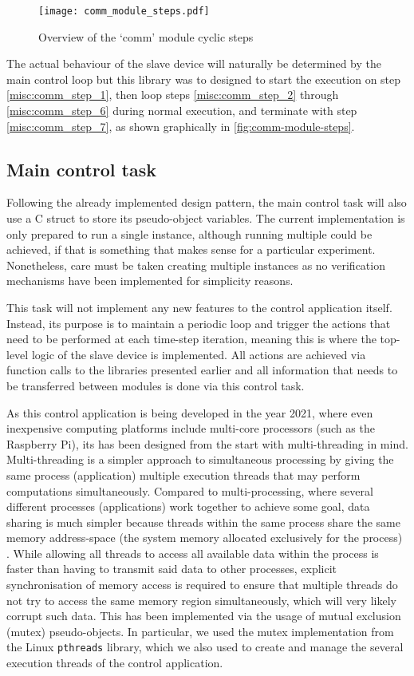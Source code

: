 \begin{figure}[htp]
	\centering
	\texttt{[image: comm\_module\_steps.pdf]}
	\caption{Overview of the `comm' module cyclic steps}
	\label{fig:comm-module-steps}
\end{figure}

The actual behaviour of the slave device will naturally be determined by the main control loop but this library was to designed to start the execution on step \ref{misc:comm_step_1}, then loop steps \ref{misc:comm_step_2} through \ref{misc:comm_step_6} during normal execution, and terminate with step \ref{misc:comm_step_7}, as shown graphically in \autoref{fig:comm-module-steps}.

\subsection{Main control task}
Following the already implemented design pattern, the main control task will also use a C struct to store its pseudo-object variables.
The current implementation is only prepared to run a single instance, although running multiple could be achieved, if that is something that makes sense for a particular experiment.
Nonetheless, care must be taken creating multiple instances as no verification mechanisms have been implemented for simplicity reasons.

This task will not implement any new features to the control application itself.
Instead, its purpose is to maintain a periodic loop and trigger the actions that need to be performed at each time-step iteration, meaning this is where the top-level logic of the slave device is implemented.
All actions are achieved via function calls to the libraries presented earlier and all information that needs to be transferred between modules is done via this control task.

As this control application is being developed in the year 2021, where even inexpensive computing platforms include multi-core processors (such as the Raspberry Pi), its has been designed from the start with multi-threading in mind.
Multi-threading is a simpler approach to simultaneous processing by giving the same process (application) multiple execution threads that may perform computations simultaneously.
Compared to multi-processing, where several different processes (applications) work together to achieve some goal, data sharing is much simpler because threads within the same process share the same memory address-space (the system memory allocated exclusively for the process) \cite{technology:mp-vs-mt}.
While allowing all threads to access all available data within the process is faster than having to transmit said data to other processes, explicit synchronisation of memory access is required to ensure that multiple threads do not try to access the same memory region simultaneously, which will very likely corrupt such data.
This has been implemented via the usage of mutual exclusion (mutex) pseudo-objects.
In particular, we used the mutex implementation from the Linux \verb|pthreads| library, which we also used to create and manage the several execution threads of the control application.

